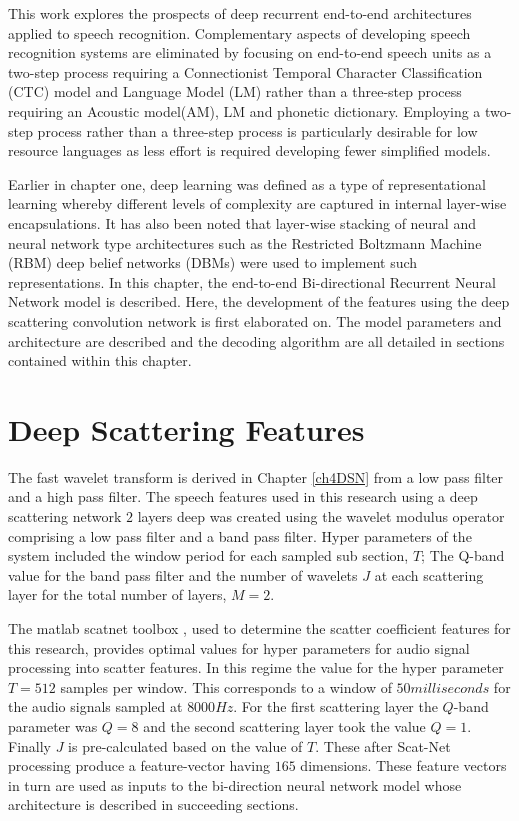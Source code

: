 This work explores the prospects of deep recurrent end-to-end architectures applied to speech recognition. Complementary aspects of developing speech recognition systems are eliminated by focusing on end-to-end speech units as a two-step process requiring a Connectionist Temporal Character Classification (CTC)\citep{graves2006connectionist} model and Language Model (LM) rather than a three-step process requiring an Acoustic model(AM), LM and phonetic dictionary. Employing a two-step process rather than a three-step process is particularly desirable for low resource languages as less effort is required developing fewer simplified models.

Earlier in chapter one, deep learning was defined as a type of representational learning whereby different levels of complexity are captured in internal layer-wise encapsulations. It has also been noted that layer-wise stacking of neural and neural network type architectures such as the Restricted Boltzmann Machine (RBM) deep belief networks (DBMs) were used to implement such representations. In this chapter, the end-to-end Bi-directional Recurrent Neural Network model is described. Here, the development of the features using the deep scattering convolution network is first elaborated on. The model parameters and architecture are described and the decoding algorithm are all detailed in sections contained within this chapter.

\section{Deep Scattering Features}\label{sec_c7_wparams}
The fast wavelet transform is derived in Chapter \ref{ch4DSN} from a low pass filter and a high pass filter.  The speech features used in this research using a deep scattering network $2$ layers deep was created using the wavelet modulus operator comprising a low pass filter and a band pass filter.  Hyper parameters of the system included the window period for each sampled sub section, $T$;  The Q-band value for the band pass filter and the number of wavelets $J$ at each scattering layer for the total number of layers, $M=2$.

The matlab scatnet toolbox \citep{anden2014scatnet}, used to determine the scatter coefficient features for this research, provides optimal values for hyper parameters for audio signal processing into scatter features.  In this regime the value for the hyper parameter $T=512$ samples per window. This corresponds to a window of $50 milliseconds$ for the audio signals sampled at $8000 Hz$.  For the first scattering layer the $Q$-band parameter was $Q=8$ and the second scattering layer took the value  $Q=1$.  Finally $J$ is pre-calculated based on the value of $T$.  These after Scat-Net processing produce a feature-vector having $165$  dimensions.  These feature vectors in turn are used as inputs to the bi-direction neural network model whose architecture is described in  succeeding sections.


